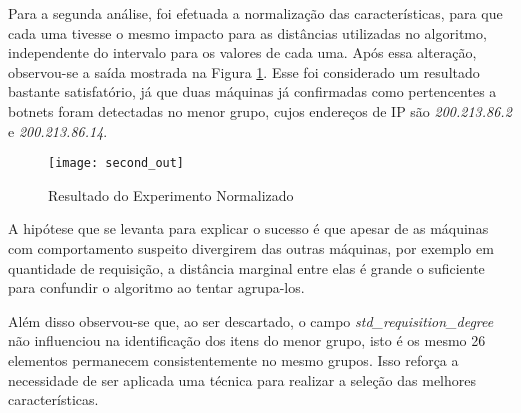 Para a segunda análise, foi efetuada a normalização das características, para que cada uma tivesse o mesmo impacto para as distâncias utilizadas no algoritmo, independente do intervalo para os valores de cada uma. Após essa alteração, observou-se a saída mostrada na Figura \ref{fig:second_out}. Esse foi considerado um resultado bastante satisfatório, já que duas máquinas já confirmadas como pertencentes a botnets foram detectadas no menor grupo, cujos endereços de IP são \textit{200.213.86.2} e \textit{200.213.86.14}.

\begin{figure}[htbp]
\centering
\texttt{[image: second\_out]}
\caption[Resultado do Experimento Normalizado]{Resultado do Experimento Normalizado} \label{fig:second_out}
\end{figure}

A hipótese que se levanta para explicar o sucesso é que apesar de as máquinas com comportamento suspeito divergirem das outras máquinas, por exemplo em quantidade de requisição, a distância marginal entre elas é grande o suficiente para confundir o algoritmo ao tentar agrupa-los.

Além disso observou-se que, ao ser descartado, o campo \textit{std\_requisition\_degree} não influenciou na identificação dos itens do menor grupo, isto é os mesmo 26 elementos permanecem consistentemente no mesmo grupos. Isso reforça a necessidade de ser aplicada uma técnica para realizar a seleção das melhores características.